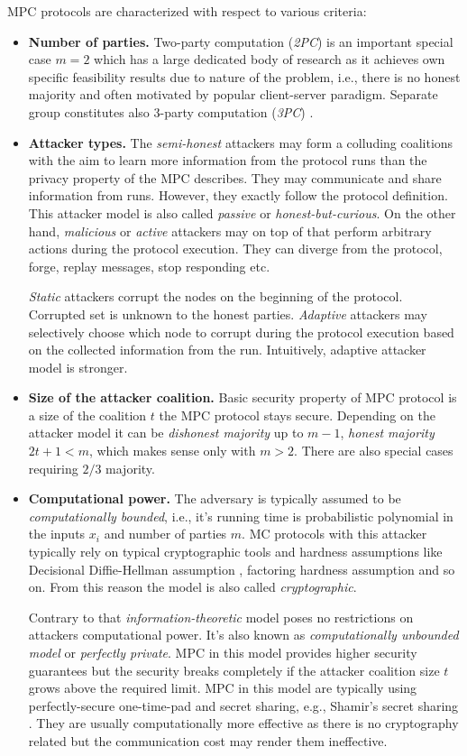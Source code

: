 \documentclass[
  digital, %
  twoside, %
  table,   %
  lof,     %
  lot,     %
]{fithesis3}
\newcommand{\itembf}[1]{\item {\bf{#1}}}
\begin{document}
MPC protocols are characterized with respect to various criteria:
\begin{itemize}
    \itembf{Number of parties.} Two-party computation (\emph{2PC}) is an important special case $m=2$ which has a large dedicated body of research as it achieves own specific feasibility results due to nature of the problem, i.e., there is no honest majority and often motivated by popular client-server paradigm. Separate group constitutes also 3-party computation (\emph{3PC}) \cite{CKMZ14, MRZ15}.

    \itembf{Attacker types.} The \emph{semi-honest} attackers may form a colluding coalitions with the aim to learn more information from the protocol runs than the privacy property of the MPC describes. They may communicate and share information from runs. However, they exactly follow the protocol definition. This attacker model is also called \emph{passive} or \emph{honest-but-curious}. 
    On the other hand, \emph{malicious} or \emph{active} attackers may on top of that perform arbitrary actions during the protocol execution. They can diverge from the protocol, forge, replay messages, stop responding etc.

    \emph{Static} attackers corrupt the nodes on the beginning of the protocol. Corrupted set is unknown to the honest parties. \emph{Adaptive} attackers may selectively choose which node to corrupt during the protocol execution based on the collected information from the run. Intuitively, adaptive attacker model is stronger.
    
    \itembf{Size of the attacker coalition.} Basic security property of MPC protocol is a size of the coalition $t$ the MPC protocol stays secure. Depending on the attacker model it can be \emph{dishonest majority} up to $m-1$, \emph{honest majority} $2t+1 < m$, which makes sense only with $m>2$. There are also special cases requiring $2/3$ majority.

    \itembf{Computational power.} The adversary is typically assumed to be \emph{computationally bounded}, i.e., it's running time is probabilistic polynomial in the inputs $x_i$ and number of parties $m$.
    MC protocols with this attacker typically rely on typical cryptographic tools and hardness assumptions like Decisional Diffie-Hellman assumption \cite{KL07}, factoring hardness assumption and so on. From this reason the model is also called \emph{cryptographic}.
    
    Contrary to that \emph{information-theoretic} model poses no restrictions on attackers computational power. It's also known as \emph{computationally unbounded model} or \emph{perfectly private}. MPC in this model provides higher security guarantees but the security breaks completely if the attacker coalition size $t$ grows above the required limit. MPC in this model are typically using perfectly-secure one-time-pad and secret sharing, e.g., Shamir's secret sharing \cite{Shamir79}. They are usually computationally more effective as there is no cryptography related but the communication cost may render them ineffective. 
    

\end{itemize}
\end{document}
